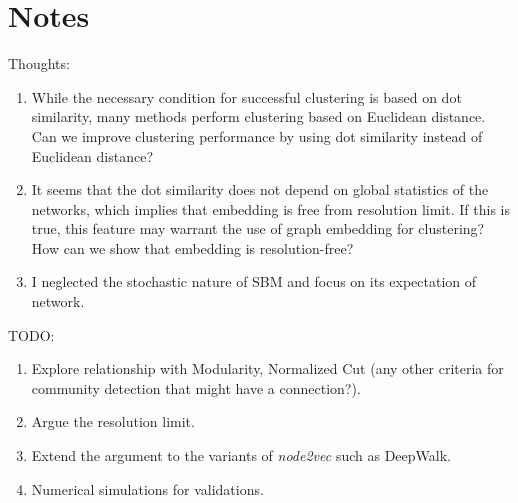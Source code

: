 \documentclass[12pt]{article} %
\begin{document}
\section{Notes}

Thoughts:
\begin{enumerate}
\item While the necessary condition for successful clustering is based on dot similarity, many methods perform clustering based on Euclidean distance. Can we improve clustering performance by using dot similarity instead of Euclidean distance?
\item It seems that the dot similarity does not depend on global statistics of the networks, which implies that embedding is free from resolution limit. If this is true, this feature may warrant the use of graph embedding for clustering? How can we show that embedding is resolution-free?
\item I neglected the stochastic nature of SBM and focus on its expectation of network.
\end{enumerate}

\noindent TODO:
\begin{enumerate}
\item Explore relationship with Modularity, Normalized Cut (any other criteria for community detection that might have a connection?).
\item Argue the resolution limit.
\item Extend the argument to the variants of \textit{node2vec} such as DeepWalk.
\item Numerical simulations for validations.
\end{enumerate}

\printbibliography{}
\end{document}
